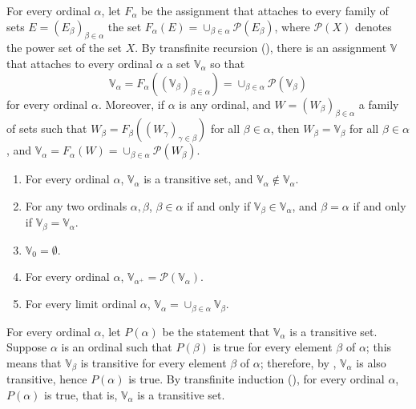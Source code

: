 \documentclass{article}
\begin{document}
For every ordinal \(\alpha\), let \(F_\alpha\) be the assignment that
attaches to every family of sets \(E = (E_\beta)_{\beta \in \alpha}\)
the set
\(F_\alpha(E) = \cup_{\beta \in \alpha} \mathcal{P}(E_\beta)\), where
\(\mathcal{P}(X)\) denotes the power set of the set \(X\).  By
transfinite recursion (), there is an assignment
\(\mathbb{V}\) that attaches to every ordinal \(\alpha\) a set
\(\mathbb{V}_\alpha\) so that
\begin{displaymath}
  \mathbb{V}_\alpha =
  F_\alpha ((\mathbb{V}_\beta)_{\beta \in \alpha}) =
  \cup_{\beta \in \alpha} \mathcal{P}(\mathbb{V}_\beta)
\end{displaymath}
for every ordinal \(\alpha\).  Moreover, if \(\alpha\) is any ordinal,
and \(W = (W_\beta)_{\beta \in \alpha}\) a family of sets such that
\(W_\beta = F_\beta ((W_\gamma)_{\gamma \in \beta})\) for all
\(\beta \in \alpha\), then \(W_\beta = \mathbb{V}_\beta\) for all
\(\beta \in \alpha\), and \(\mathbb{V}_\alpha = F_\alpha(W) =
\cup_{\beta \in \alpha}\mathcal{P}(W_\beta)\).

\begin{theorem}
  \label{thm:xijkf7v0}
  \begin{enumerate}
  \item For every ordinal \(\alpha\), \(\mathbb{V}_\alpha\) is a
    transitive set, and
    \(\mathbb{V}_\alpha \notin \mathbb{V}_\alpha\).
  \item For any two ordinals \(\alpha, \beta\), \(\beta \in \alpha\)
    if and only if \(\mathbb{V}_\beta \in \mathbb{V}_\alpha\), and
    \(\beta = \alpha\) if and only if
    \(\mathbb{V}_\beta = \mathbb{V}_\alpha\).
  \item \(\mathbb{V}_0 = \emptyset\).
  \item For every ordinal \(\alpha\),
    \(\mathbb{V}_{\alpha^+} = \mathcal{P}(\mathbb{V}_\alpha)\).
  \item For every limit ordinal \(\alpha\),
    \(\mathbb{V}_\alpha = \cup_{\beta \in \alpha}\mathbb{V}_\beta\).
  \end{enumerate}
\end{theorem}

For every ordinal \(\alpha\), let \(P(\alpha)\) be the statement that
\(\mathbb{V}_\alpha\) is a transitive set.  Suppose \(\alpha\) is an
ordinal such that \(P(\beta)\) is true for every element \(\beta\) of
\(\alpha\); this means that \(\mathbb{V}_\beta\) is transitive for
every element \(\beta\) of \(\alpha\); therefore, by
, \(\mathbb{V}_\alpha\) is also transitive, hence
\(P(\alpha)\) is true.  By transfinite induction
(), for every ordinal \(\alpha\), \(P(\alpha)\) is
true, that is, \(\mathbb{V}_\alpha\) is a transitive set.
\end{document}
